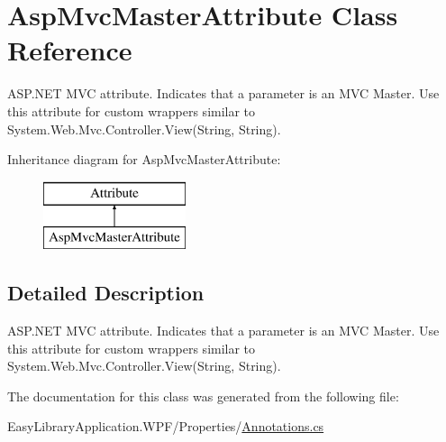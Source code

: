 \hypertarget{class_asp_mvc_master_attribute}{}\section{Asp\+Mvc\+Master\+Attribute Class Reference}
\label{class_asp_mvc_master_attribute}


A\+S\+P.\+N\+ET M\+VC attribute. Indicates that a parameter is an M\+VC Master. Use this attribute for custom wrappers similar to {\ttfamily System.\+Web.\+Mvc.\+Controller.\+View(\+String, String)}.  


Inheritance diagram for Asp\+Mvc\+Master\+Attribute\+:\begin{figure}[H]
\begin{center}
\leavevmode
\includegraphics[height=2.000000cm]{class_asp_mvc_master_attribute}
\end{center}
\end{figure}


\subsection{Detailed Description}
A\+S\+P.\+N\+ET M\+VC attribute. Indicates that a parameter is an M\+VC Master. Use this attribute for custom wrappers similar to {\ttfamily System.\+Web.\+Mvc.\+Controller.\+View(\+String, String)}. 



The documentation for this class was generated from the following file\+:\begin{DoxyCompactItemize}
\item 
Easy\+Library\+Application.\+W\+P\+F/\+Properties/\mbox{\hyperlink{_annotations_8cs}{Annotations.\+cs}}\end{DoxyCompactItemize}
